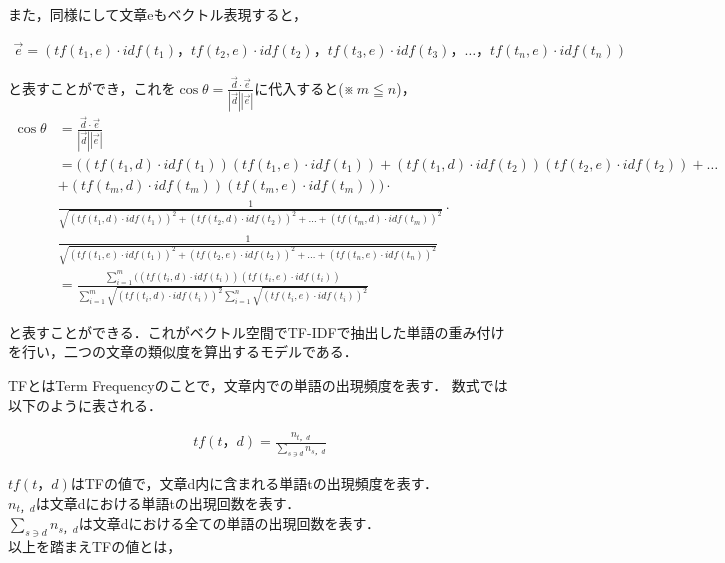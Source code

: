 また，同様にして文章eもベクトル表現すると，

\begin{align}
\vec{e} = (tf(t_{1},e) \cdot idf(t_{1})，tf(t_{2},e) \cdot idf(t_{2})，tf(t_{3},e) \cdot idf(t_{3})， \ldots ，tf(t_{n},e) \cdot idf(t_{n})) \nonumber
\end{align}

と表すことができ，これを$ \cos \theta = \frac{\vec{d} \cdot \vec{e}}{|\vec{d}| |\vec{e}|} $に代入すると(※\,$ m \leqq n $)，
\begin{align}
\cos \theta &= \frac{\vec{d} \cdot \vec{e}}{|\vec{d}| |\vec{e}|} \nonumber \\
            &= ((tf(t_{1},d) \cdot idf(t_{1}))(tf(t_{1},e) \cdot idf(t_{1})) + (tf(t_{1},d) \cdot idf(t_{2}))(tf(t_{2},e) \cdot idf(t_{2})) + \ldots \nonumber \\
            &+ (tf(t_{m},d) \cdot idf(t_{m}))(tf(t_{m},e) \cdot idf(t_{m}))) \cdot \nonumber \\
            &\frac{1}{\sqrt{(tf(t_{1},d) \cdot idf(t_{1}))^2 + (tf(t_{2},d) \cdot idf(t_{2}))^2 + \ldots + (tf(t_{m},d) \cdot idf(t_{m}))^2}} \cdot \nonumber \\[2mm]
            &\frac{1}{\sqrt{(tf(t_{1},e) \cdot idf(t_{1}))^2 + (tf(t_{2},e) \cdot idf(t_{2}))^2 + \ldots + (tf(t_{n},e) \cdot idf(t_{n}))^2}} \nonumber \\[2mm]
            &= \frac{ \sum_{i=1}^{m} ((tf(t_{i},d) \cdot idf(t_{i}))(tf(t_{i},e) \cdot idf(t_{i}))}{\sum_{i=1}^{m} \sqrt{(tf(t_{i},d) \cdot idf(t_{i}))^2} \sum_{i=1}^{n} \sqrt{(tf(t_{i},e) \cdot idf(t_{i}))^2}} \label{eq:tfidf}
\end{align}

と表すことができる．これがベクトル空間でTF-IDFで抽出した単語の重み付けを行い，二つの文章の類似度を算出するモデルである．


\label{tech:tfidf}
TFとはTerm Frequencyのことで，文章内での単語の出現頻度を表す．
数式では以下のように表される．

\begin{align}
tf(t，d) = \frac{n_{t，d}}{\sum_{s \ni{d}}n_{s，d}} \nonumber
\end{align}

$ tf(t，d) $はTFの値で，文章d内に含まれる単語tの出現頻度を表す．\\
$ n_{t，d} $は文章dにおける単語tの出現回数を表す．\\
$ \sum_{s \ni{d}}n_{s，d} $は文章dにおける全ての単語の出現回数を表す．\\
以上を踏まえTFの値とは，

